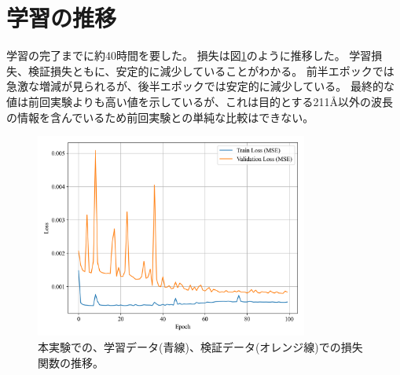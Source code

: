   \section{学習の推移}
    学習の完了までに約40時間を要した。
    損失は図\ref{fig:exp2_learn_progress}のように推移した。
    学習損失、検証損失ともに、安定的に減少していることがわかる。
    前半エポックでは急激な増減が見られるが、後半エポックでは安定的に減少している。
    最終的な値は前回実験よりも高い値を示しているが、これは目的とする211\AA 以外の波長の情報を含んでいるため前回実験との単純な比較はできない。
    \begin{figure}[htbp]
      \centering
      \includegraphics[width=0.8\textwidth]{figures/exp2/loss.png}
      \caption{本実験での、学習データ(青線)、検証データ(オレンジ線)での損失関数の推移。}
      \label{fig:exp2_learn_progress}
    \end{figure}


